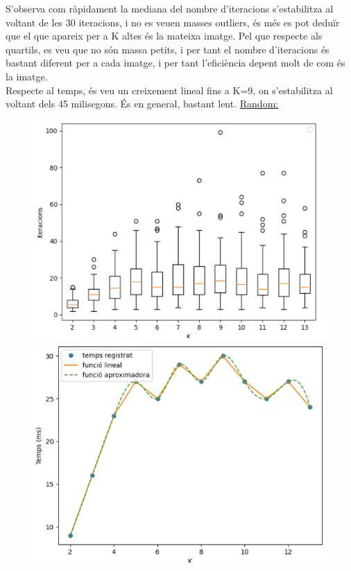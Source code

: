 \documentclass[a4paper, 11pt]{article}
\begin{document}
\justify
S'observa com ràpidament la mediana del nombre d'iteracions s'estabilitza al voltant de les 30 iteracions, i no es veuen masses outliers, és més es pot deduïr que el que apareix per a K altes és la mateixa imatge. Pel que respecte als quartils, es veu que no són massa petits, i per tant el nombre d'iteracions és bastant diferent per a cada imatge, i per tant l'eficiència depent molt de com és la imatge.\\
Respecte al temps, és veu un creixement lineal fins a K=9, on s'estabilitza al voltant dels 45 milisegons. És en general, bastant lent.
\newpage
\center\underline{Random:}
\begin{figure}[h!]
\centering
\begin{minipage}{.5\textwidth}
  \centering
  \includegraphics[width=.8\linewidth]{boxplot_random_centroides.PNG}
\end{minipage}%
\begin{minipage}{.5\textwidth}
  \centering
  \includegraphics[width=.8\linewidth]{temps_random_centroides.PNG}
\end{minipage}
\end{figure}
\end{document}
